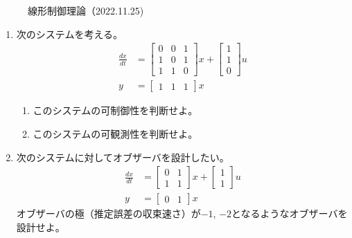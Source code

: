 \documentclass[a4paper, fleqn,twocolumn]{jbook}
\renewcommand{\bmatrix}{\left[\begin{array}}
\newcommand{\ematrix}{\end{array}\right]}
\begin{document}
\begin{figure}[t]
\begin{center}
線形制御理論（2022.11.25)
\vspace{-5mm}
\end{center}
\end{figure}


\begin{enumerate}


\item
次のシステムを考える。
\begin{align}
	\frac{dx}{dt}
	&=	\bmatrix{ccc}
			0 & 0 & 1\\
			1 & 0 & 1\\
			1 & 1 & 0
		\ematrix
		x
		+
		\bmatrix{c}
			1 \\
			1 \\
			0 
		\ematrix
		u
\nonumber \\
	y 
	&=	\bmatrix{ccc}
			1 & 1 & 1
		\ematrix
		x
\nonumber 
\end{align}


\begin{enumerate}

\item
このシステムの可制御性を判断せよ。
\vspace{12cm}

\item
このシステムの可観測性を判断せよ。
\vspace{12cm}

\end{enumerate}

\newpage 







\item
次のシステムに対してオブザーバを設計したい。
\begin{align}
	\frac{dx}{dt}
	&=	\bmatrix{cc}
			0 & 1 \\
			1 & 1
		\ematrix
		x
		+
		\bmatrix{c}
			1 \\
			1 
		\ematrix
		u
\nonumber \\
	y 
	&=	\bmatrix{cc}
			0 & 1 
		\ematrix
		x
\nonumber 
\end{align}
オブザーバの極（推定誤差の収束速さ）が$-1$, $-2$となるようなオブザーバを設計せよ。



\end{enumerate}
\end{document}

